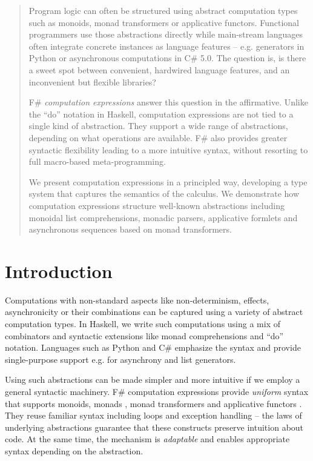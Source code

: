 \documentclass[runningheads,a4paper]{llncs}
\begin{document}
\begin{abstract}
Program logic can often be structured using abstract computation types such as monoids, monad transformers or 
applicative functors. Functional programmers use those abstractions directly while main-stream
languages often integrate concrete instances as language features -- e.g. generators in Python
or asynchronous computations in C\# 5.0. The question is, is there a sweet spot between 
convenient, hardwired language features, and an inconvenient but flexible libraries?

\quad F\# \emph{computation expressions} answer this question in the affirmative. Unlike 
the ``do'' notation in Haskell, computation expressions are not tied to a single kind of abstraction.
They support a wide range of abstractions, depending on what operations are available. F\# also 
provides greater syntactic flexibility leading to a more intuitive syntax, without resorting to 
full macro-based meta-programming. 

\quad We present computation expressions in a principled way, developing a type system that captures 
the semantics of the calculus. We demonstrate how computation expressions 
structure well-known abstractions including monoidal list comprehensions, monadic parsers, 
applicative formlets and asynchronous sequences based on monad transformers. 

\end{abstract}


\section{Introduction}
Computations with non-standard aspects like non-determinism, effects, asynchronicity or their
combinations can be captured using a variety of abstract computation types. In Haskell, we write 
such computations using a mix of combinators and syntactic extensions like monad comprehensions 
\cite{monad-compre} and ``do'' notation. Languages such as Python and C\# emphasize the syntax 
and provide single-purpose support e.g. for asynchrony \cite{cs-async} and list generators. 

Using such abstractions can be made simpler and more intuitive 
if we employ a general syntactic machinery. F\# computation expressions provide
\emph{uniform} syntax that supports monoids, monads \cite{monads-fp}, monad transformers 
\cite{monad-transformers} and applicative functors \cite{applicative}. They reuse familiar 
syntax including loops and exception handling -- the laws of underlying
abstractions guarantee that these constructs preserve intuition about code. At the same time, 
the mechanism is \emph{adaptable} and enables appropriate syntax depending on the abstraction.
\end{document}
